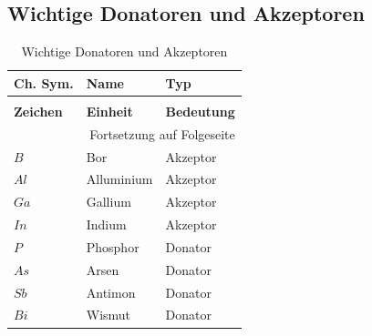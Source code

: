 \documentclass[12pt,a4paper]{report}%
\numberwithin{equation}{section}
\numberwithin{equation}{subsection}
\begin{document}
	\subsection{Wichtige Donatoren und Akzeptoren} \label{ch:don/acc}
	\renewcommand{\arraystretch}{1.5}
	\begin{longtable} {|p{2cm}|p{3cm}|p{8.4cm}|} \hline
	\textbf{Ch. Sym.} & \textbf{Name} & \textbf{Typ} \\
	\hline
	\endfirsthead %
	\caption{Wichtige Donatoren und Akzeptoren}\\ \hline
	\textbf{Zeichen} & \textbf{Einheit} & \textbf{Bedeutung} \\
	\hline
	\endhead %
	\multicolumn{3}{r}{Fortsetzung auf Folgeseite}\\
	\endfoot
	\hline
	\endlastfoot
	$B$ & Bor & Akzeptor \\ \hline
	$Al$ & Alluminium & Akzeptor \\ \hline
	$Ga$ & Gallium & Akzeptor \\ \hline
	$In$ & Indium & Akzeptor \\ \hline
	$P$ & Phosphor & Donator \\ \hline
	$As$ & Arsen & Donator \\ \hline
	$Sb$ & Antimon & Donator \\ \hline
	$Bi$ & Wismut & Donator \\ \hline
	\end{longtable}
	\renewcommand{\arraystretch}{1}
	\newpage
\end{document}
